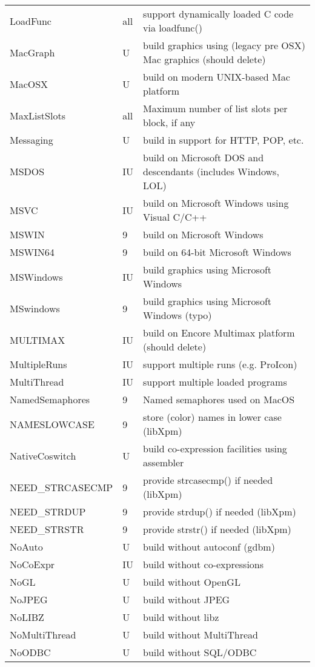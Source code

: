 \begin{xtabular}{|m{1.8in}|m{0.5in}|m{4.0in}|}
LoadFunc & all & support dynamically loaded C code via loadfunc() \\
MacGraph & U & build graphics using (legacy pre OSX) Mac graphics (should delete)  \\
MacOSX & U & build on modern UNIX-based Mac platform \\
MaxListSlots & all & Maximum number of list slots per block, if any \\
Messaging & U & build in support for HTTP, POP, etc. \\
MSDOS & IU & build on Microsoft DOS and descendants (includes Windows, LOL) \\
MSVC & IU & build on Microsoft Windows using Visual C/C++ \\
MSWIN & 9 & build on Microsoft Windows \\
MSWIN64 & 9 & build on 64-bit Microsoft Windows \\
MSWindows & IU & build graphics using Microsoft Windows \\
MSwindows & 9 & build graphics using Microsoft Windows (typo) \\
MULTIMAX & IU & build on Encore Multimax platform (should delete) \\
MultipleRuns & IU & support multiple runs (e.g. ProIcon) \\
MultiThread & IU & support multiple loaded programs \\
NamedSemaphores & 9 & Named semaphores used on MacOS \\
NAMESLOWCASE & 9 & store (color) names in lower case (libXpm) \\
NativeCoswitch & U & build co-expression facilities using assembler \\
NEED\_STRCASECMP & 9 & provide strcasecmp() if needed (libXpm) \\
NEED\_STRDUP & 9 & provide strdup() if needed (libXpm) \\
NEED\_STRSTR & 9 & provide strstr() if needed (libXpm) \\
NoAuto & U & build without autoconf (gdbm) \\
NoCoExpr & IU & build without co-expressions \\
NoGL & U & build without OpenGL \\
NoJPEG & U & build without JPEG \\
NoLIBZ & U & build without libz \\
NoMultiThread & U & build without MultiThread \\
NoODBC & U & build without SQL/ODBC \\

\end{xtabular}
